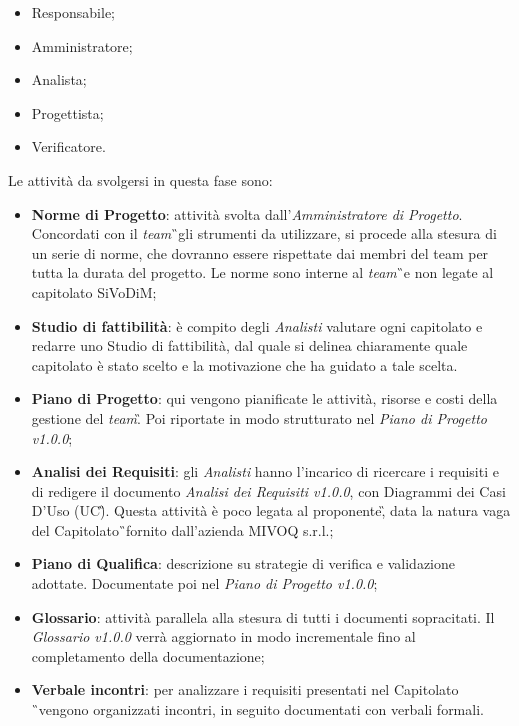 \begin{itemize}
	\item Responsabile;
	\item Amministratore;
	\item Analista;
	\item Progettista;
	\item Verificatore.
\end{itemize}
Le attività da svolgersi in questa fase sono:
\begin{itemize}
	\item \textbf{Norme di Progetto}: attività svolta 
	dall'\textit{Amministratore di 
	Progetto}. Concordati con il \textit{team}\G\ gli strumenti da utilizzare, 
	si procede 	alla stesura di un serie di norme, che dovranno essere 
	rispettate dai membri del team per tutta la durata del progetto. Le norme 
	sono interne al \textit{team}\G\ e non legate al capitolato SiVoDiM;
	\item \textbf{Studio di fattibilità}: è compito degli \textit{Analisti} 
	valutare ogni capitolato e redarre uno Studio di fattibilità, dal quale si 
	delinea chiaramente quale capitolato è stato scelto e la motivazione che ha 
	guidato a tale scelta.
	\item \textbf{Piano di Progetto}: qui vengono pianificate le attività, 
	risorse e costi della gestione del \textit{team}\G. Poi riportate in modo 
	strutturato nel \textit{Piano di Progetto v1.0.0};
	\item \textbf{Analisi dei Requisiti}: gli \textit{Analisti} hanno 
	l'incarico di ricercare i requisiti e di redigere il documento 
	\textit{Analisi dei Requisiti v1.0.0}, con Diagrammi dei Casi D'Uso (UC\G). 
	Questa attività è poco legata	al proponente\G, data la natura vaga del 
	Capitolato\G\ fornito dall'azienda MIVOQ s.r.l.;
	\item \textbf{Piano di Qualifica}: descrizione su strategie di verifica e 
	validazione adottate. Documentate poi nel \textit{Piano di Progetto v1.0.0};
	\item \textbf{Glossario}: attività parallela alla stesura di tutti i 
	documenti sopracitati. Il \textit{Glossario v1.0.0} verrà aggiornato in 
	modo incrementale fino al completamento della documentazione;
	\item \textbf{Verbale incontri}: per analizzare i requisiti presentati nel 
	Capitolato \G\ vengono organizzati incontri, in seguito documentati con 
	verbali formali.
\end{itemize}

